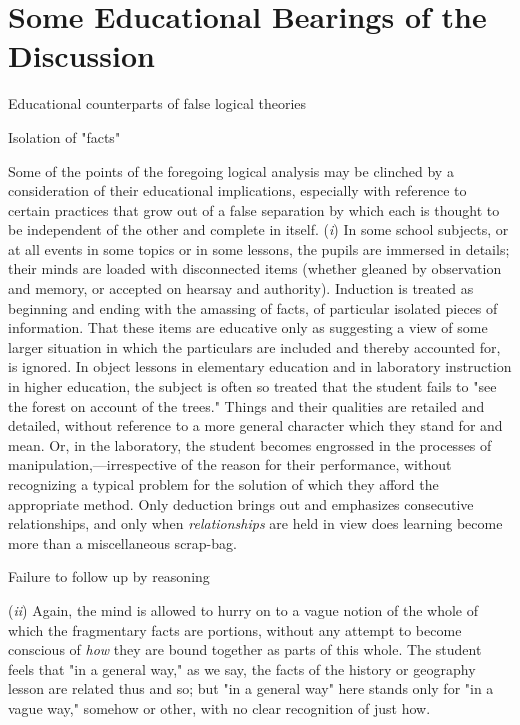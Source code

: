 \documentclass[letterpaper]{book}
\begin{document}
\section{Some Educational Bearings of the Discussion}

Educational counterparts of false logical theories

Isolation of "facts"

Some of the points of the foregoing logical analysis may be clinched by
a consideration of their educational implications, especially with
reference to certain practices that grow out of a false separation by
which each is thought to be independent of the other and complete in
itself. (\emph{i}) In some school subjects, or at all events in some
topics or in some lessons, the pupils are immersed in details; their
minds are loaded with disconnected items (whether gleaned by observation
and memory, or accepted on hearsay and authority). Induction is treated
as beginning and ending with the amassing of facts, of particular
isolated pieces of information. That these items are educative only as
suggesting a view of some larger situation in which
the
particulars are included and thereby accounted for, is ignored. In
object lessons in elementary education and in laboratory instruction in
higher education, the subject is often so treated that the student fails
to "see the forest on account of the trees." Things and their qualities
are retailed and detailed, without reference to a more general character
which they stand for and mean. Or, in the laboratory, the student
becomes engrossed in the processes of manipulation,---irrespective of
the reason for their performance, without recognizing a typical problem
for the solution of which they afford the appropriate method. Only
deduction brings out and emphasizes consecutive relationships, and only
when \emph{relationships} are held in view does learning become more
than a miscellaneous scrap-bag.

Failure to follow up by reasoning

(\emph{ii}) Again, the mind is allowed to hurry on to a vague notion of
the whole of which the fragmentary facts are portions, without any
attempt to become conscious of \emph{how} they are bound together as
parts of this whole. The student feels that "in a general way," as we
say, the facts of the history or geography lesson are related thus and
so; but "in a general way" here stands only for "in a vague way,"
somehow or other, with no clear recognition of just how.
\end{document}
